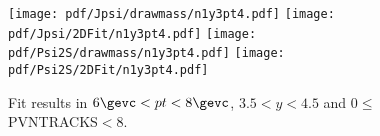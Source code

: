 \begin{figure}[H]
\begin{center}
\texttt{[image: pdf/Jpsi/drawmass/n1y3pt4.pdf]}
\texttt{[image: pdf/Jpsi/2DFit/n1y3pt4.pdf]}
\vspace*{-0.5cm}
\texttt{[image: pdf/Psi2S/drawmass/n1y3pt4.pdf]}
\texttt{[image: pdf/Psi2S/2DFit/n1y3pt4.pdf]}
\vspace*{-0.5cm}
\end{center}
\caption{Fit results in $6\gevc<pt<8\gevc$, $3.5<y<4.5$ and 0$\leq$PVNTRACKS$<$8.}
\label{Fitn1y3pt4}
\end{figure}
